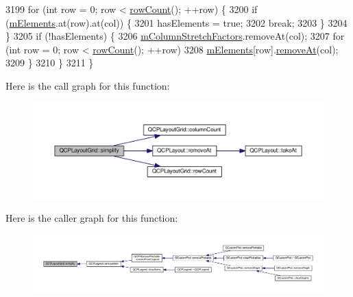 \begin{DoxyCode}
3199     \textcolor{keywordflow}{for} (\textcolor{keywordtype}{int} row = 0; row < \hyperlink{class_q_c_p_layout_grid_af8e6c7a05864ebe610c87756c7b9079c}{rowCount}(); ++row) \{
3200       \textcolor{keywordflow}{if} (\hyperlink{class_q_c_p_layout_grid_a2ec4664bcfb5d479255e50f0c074f7c9}{mElements}.at(row).at(col)) \{
3201         hasElements = \textcolor{keyword}{true};
3202         \textcolor{keywordflow}{break};
3203       \}
3204     \}
3205     \textcolor{keywordflow}{if} (!hasElements) \{
3206       \hyperlink{class_q_c_p_layout_grid_ac6aabe62339f94f18b9f8adab94b1840}{mColumnStretchFactors}.removeAt(col);
3207       \textcolor{keywordflow}{for} (\textcolor{keywordtype}{int} row = 0; row < \hyperlink{class_q_c_p_layout_grid_af8e6c7a05864ebe610c87756c7b9079c}{rowCount}(); ++row)
3208         \hyperlink{class_q_c_p_layout_grid_a2ec4664bcfb5d479255e50f0c074f7c9}{mElements}[row].\hyperlink{class_q_c_p_layout_a2403f684fee3ce47132faaeed00bb066}{removeAt}(col);
3209     \}
3210   \}
3211 \}
\end{DoxyCode}


Here is the call graph for this function\+:\nopagebreak
\begin{figure}[H]
\begin{center}
\leavevmode
\includegraphics[width=350pt]{class_q_c_p_layout_grid_a08bba60e4acd20165526a8fd7f986b58_cgraph}
\end{center}
\end{figure}




Here is the caller graph for this function\+:\nopagebreak
\begin{figure}[H]
\begin{center}
\leavevmode
\includegraphics[width=350pt]{class_q_c_p_layout_grid_a08bba60e4acd20165526a8fd7f986b58_icgraph}
\end{center}
\end{figure}


